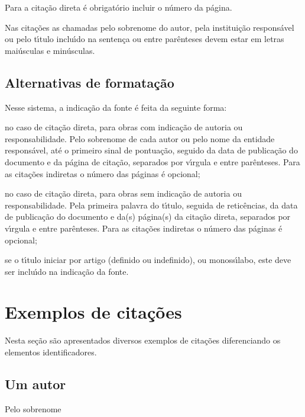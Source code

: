 Para a cita\c{c}\~ao direta \'e obrigat\'orio incluir o n\'umero da p\'agina.

Nas cita\c{c}\~oes as chamadas pelo sobrenome do autor, pela institui\c{c}\~ao respons\'avel ou pelo t\'{\i}tulo inclu\'{\i}do na senten\c{c}a ou entre par\^enteses devem estar em letras mai\'usculas e min\'usculas.

\subsection{Alternativas de formata\c{c}\~ao}
Nesse sistema, a indica\c{c}\~ao da fonte \'e feita da seguinte forma:

\begin{alineas}
	\item
	no caso de cita\c{c}\~ao direta, para obras com indica\c{c}\~ao de autoria ou responsabilidade. Pelo sobrenome de cada autor ou pelo nome da entidade respons\'avel, at\'e o primeiro sinal de pontua\c{c}\~ao, seguido da data de publica\c{c}\~ao do documento e da p\'agina de cita\c{c}\~ao, separados por v\'{\i}rgula e entre par\^enteses. Para as cita\c{c}\~oes indiretas o n\'umero das p\'aginas \'e opcional;
	\item
	no caso de cita\c{c}\~ao direta, para obras sem indica\c{c}\~ao de autoria ou responsabilidade. Pela primeira palavra do t\'{\i}tulo, seguida de retic\^encias, da data de publica\c{c}\~ao do documento e da(s) p\'agina(s) da cita\c{c}\~ao direta, separados por v\'{\i}rgula e entre par\^enteses. Para as cita\c{c}\~oes indiretas o n\'umero das p\'aginas \'e opcional;
	\item
	se o t\'{\i}tulo iniciar por artigo (definido ou indefinido), ou monoss\'{\i}labo, este deve ser inclu\'{\i}do na indica\c{c}\~ao da fonte.
	
\end{alineas}
	
\section{Exemplos de cita\c{c}\~oes}

Nesta se\c{c}\~ao s\~ao apresentados diversos exemplos de cita\c{c}\~oes diferenciando os elementos identificadores. 

\subsection{Um autor}

Pelo sobrenome\\

